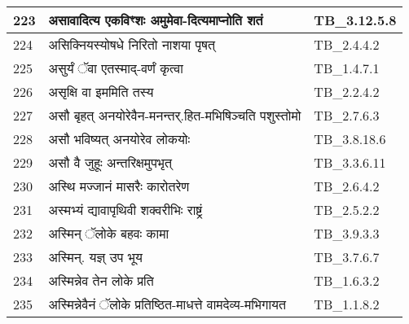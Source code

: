 \documentclass[17pt]{extarticle}
\begin{document}
\begin{longtable}{||p{0.4in}||p{4.9in}||p{0.9in}||}
    \hline
        
    223 & असावादित्य एकविꣳशः अमुमेवा{-}दित्यमाप्नोति शतं & TB\_3.12.5.8       \\
    
    \hline
        
    224 & असिक्नियस्योषधे निरितो नाशया पृषत् & TB\_2.4.4.2       \\
    
    \hline
        
    225 & असुर्यं ॅवा एतस्माद्{-}वर्णं कृत्वा & TB\_1.4.7.1       \\
    
    \hline
        
    226 & असृक्षि वा इममिति तस्य & TB\_2.2.4.2       \\
    
    \hline
        
    227 & असौ बृहत् अनयोरेवैन{-}मनन्तर्.हित{-}मभिषिञ्चति पशुस्तोमो & TB\_2.7.6.3       \\
    
    \hline
        
    228 & असौ भविष्यत् अनयोरेव लोकयोः & TB\_3.8.18.6       \\
    
    \hline
        
    229 & असौ वै जुहूः अन्तरिक्षमुपभृत् & TB\_3.3.6.11       \\
    
    \hline
        
    230 & अस्थि मज्जानं मासरैः कारोतरेण & TB\_2.6.4.2       \\
    
    \hline
        
    231 & अस्मभ्यं द्यावापृथिवी शक्वरीभिः राष्ट्रं & TB\_2.5.2.2       \\
    
    \hline
        
    232 & अस्मिन् ॅलोके बहवः कामा & TB\_3.9.3.3       \\
    
    \hline
        
    233 & अस्मिन्. यज्ञ् उप भूय & TB\_3.7.6.7       \\
    
    \hline
        
    234 & अस्मिन्नेव तेन लोके प्रति & TB\_1.6.3.2       \\
    
    \hline
        
    235 & अस्मिन्नेवैनं ॅलोके प्रतिष्ठित{-}माधत्ते वामदेव्य{-}मभिगायत & TB\_1.1.8.2       \\
    

\end{longtable}
\end{document}
